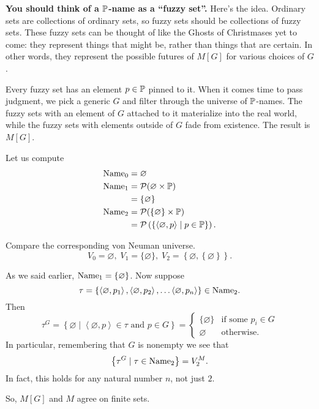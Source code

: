 \textbf{You should think of a $\mathbb P$-name as a ``fuzzy set''.}
Here's the idea.
Ordinary sets are collections of ordinary sets,
so fuzzy sets should be collections of fuzzy sets.
These fuzzy sets can be thought of like the Ghosts of Christmases yet to come:
they represent things that might be, rather than things that are certain.
In other words, they represent the possible futures of $M[G]$ for various choices of $G$.

Every fuzzy set has an element $p \in \mathbb P$ pinned to it.
When it comes time to pass judgment,
we pick a generic $G$ and filter through the universe of $\mathbb P$-names.
The fuzzy sets with an element of $G$ attached to it materialize into the real world,
while the fuzzy sets with elements outside of $G$ fade from existence.
The result is $M[G]$.

\begin{example}
	Let us compute
	\begin{align*}
		\text{Name}_0 &= \varnothing \\
		\text{Name}_1 &= \mathcal P(\varnothing \times \mathbb P) \\
		&= \{\varnothing\} \\
		\text{Name}_2 &= \mathcal P(\{\varnothing\} \times \mathbb P) \\
		&= \mathcal P\left( \left\{ 
			\left<\varnothing, p\right>
			\mid p \in \mathbb P
		\right\} \right).
	\end{align*}
\end{example}
Compare the corresponding von Neuman universe.
\[ V_0 = \varnothing, \; V_1 = \{\varnothing\}, \;
V_2 = \left\{ \varnothing, \left\{ \varnothing \right\} \right\}. \]

\begin{example}
	As we said earlier, $\text{Name}_1 = \{\varnothing\}$.
	Now suppose
	\[ \tau =
		\left\{
			\left<\varnothing, p_1\right>,
			\left<\varnothing, p_2\right>,
			\dots
			\left<\varnothing, p_n\right>
		\right\} 
		\in \text{Name}_2. \]
	Then 
	\[
		\tau^G
		= \left\{ \varnothing \mid
		\left<\varnothing, p\right> \in \tau \text{ and } p \in G\right\}
		=
		\begin{cases}
			\{\varnothing\} & \text{if some } p_i \in G \\
			\varnothing & \text{otherwise}.
		\end{cases}
	\]
	In particular, remembering that $G$ is nonempty we see that
	\[ \left\{ \tau^G \mid \tau \in \text{Name}_2 \right\} = V_2^M. \]
	In fact, this holds for any natural number $n$, not just $2$.
\end{example}
So, $M[G]$ and $M$ agree on finite sets.


